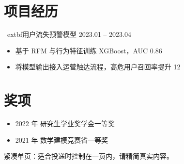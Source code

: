\documentclass[UTF8,a4paper,10pt]{ctexart}
\begin{document}
\section{项目经历}
\	extbf{用户流失预警模型} \hfill 2023.01 -- 2023.04 \\
\begin{itemize}
  \item 基于 RFM 与行为特征训练 XGBoost，AUC 0.86
  \item 将模型输出接入运营触达流程，高危用户召回率提升 12\\%
\end{itemize}

\section{奖项}
\begin{itemize}
  \item 2022 年 研究生学业奖学金一等奖
  \item 2021 年 数学建模竞赛省一等奖
\end{itemize}

\vspace{0.4em}
{\small\color{gray}紧凑单页：适合投递时控制在一页内，请精简真实内容。}
\end{document}
